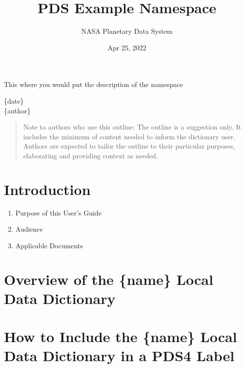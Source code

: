 \documentclass[letterpaper,10pt,english]{sphinxmanual}
\title{PDS Example Namespace}
\date{Apr 25, 2022}
\author{NASA Planetary Data System}
\begin{document}
\pagestyle{empty}
\sphinxmaketitle
\pagestyle{plain}
\sphinxtableofcontents
\pagestyle{normal}
\label{\detokenize{index::doc}}


\sphinxAtStartPar
This where you would put the description of the namespace

\sphinxstepscope

\sphinxAtStartPar
\{date\}\\
\{author\}
\begin{quote}

\sphinxAtStartPar
Note to authors who use this outline: The outline is a
suggestion only. It includes the minimum of content needed to inform the
dictionary user. Authors are expected to tailor the outline to their particular
purposes, elaborating and providing context as needed.
\end{quote}


\chapter{Introduction}
\label{\detokenize{user/user-guide:introduction}}\label{\detokenize{user/user-guide::doc}}\begin{enumerate}
%
\item {} 
\sphinxAtStartPar
Purpose of this User’s Guide

\item {} 
\sphinxAtStartPar
Audience

\item {} 
\sphinxAtStartPar
Applicable Documents

\end{enumerate}


\chapter{Overview of the \{name\} Local Data Dictionary}
\label{\detokenize{user/user-guide:overview-of-the-name-local-data-dictionary}}
\sphinxAtStartPar
{}


\chapter{How to Include the \{name\} Local Data Dictionary in a PDS4 Label}
\label{\detokenize{user/user-guide:how-to-include-the-name-local-data-dictionary-in-a-pds4-label}}
\sphinxAtStartPar
{}
\end{document}
